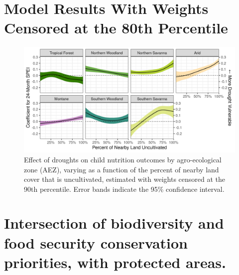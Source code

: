 \documentclass{article}
\begin{document}
\section{Model Results With Weights Censored at the 80th Percentile}
\begin{figure}[h!]
	\begin{center}
	\includegraphics[width=\linewidth]{AEZ_effects_q80.png}
	\end{center}
	\caption{Effect of droughts on child nutrition outcomes by agro-ecological zone (AEZ), varying as a function of the percent of nearby land cover that is uncultivated, estimated with weights censored at the 90th percentile.  Error bands indicate the 95\% confidence interval.}
\end{figure}



\newpage

\section{Intersection of biodiversity and food security conservation priorities, with protected areas.}
\end{document}
